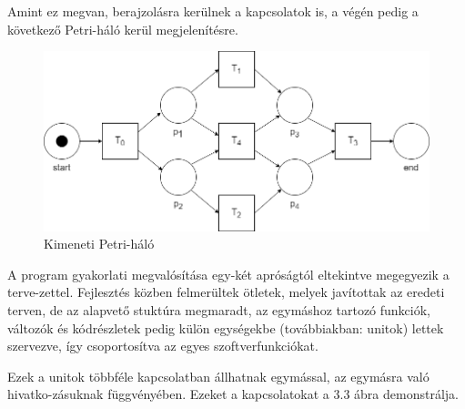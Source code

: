 \begin{example}
	Amint ez megvan, berajzolásra kerülnek a kapcsolatok is, a végén pedig a következő Petri-háló kerül megjelenítésre.
	\newpage

	\begin{figure}[h!]
	\begin{center}
	\includegraphics[width=\textwidth,keepaspectratio=true]{images/img_plan_2}
	\caption{Kimeneti Petri-háló}
	\label{fig:plan}
	\end{center}
	\end{figure}


\end{example}

\lstset{style=delphicode}



A program gyakorlati megvalósítása egy-két apróságtól eltekintve megegyezik a terve\hyp{}zettel. Fejlesztés közben felmerültek ötletek, melyek javítottak az eredeti terven, de az alapvető stuktúra megmaradt, az egymáshoz tartozó funkciók, változók és kódrészletek pedig külön egységekbe (továbbiakban: unitok) lettek szervezve, így csoportosítva az egyes szoftverfunkciókat.

Ezek a unitok többféle kapcsolatban állhatnak egymással, az egymásra való hivatko\hyp{}zásuknak függvényében. Ezeket a kapcsolatokat a 3.3 ábra demonstrálja.

